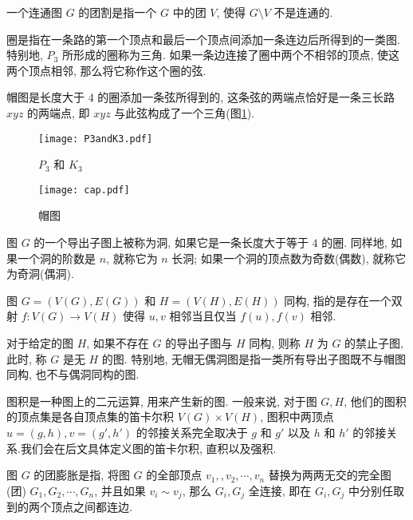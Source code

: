 \documentclass[12pt,a4paper]{article}%
\begin{document}
一个连通图 $G$ 的团割是指一个 $G$ 中的团 $V$, 使得 $G \setminus V$ 不是连通的.

圈是指在一条路的第一个顶点和最后一个顶点间添加一条连边后所得到的一类图. 特别地, $P_3$ 所形成的圈称为三角. 如果一条边连接了圈中两个不相邻的顶点, 使这两个顶点相邻, 那么将它称作这个圈的弦.

帽图是长度大于 $4$ 的圈添加一条弦所得到的, 这条弦的两端点恰好是一条三长路 $xyz$ 的两端点, 即 $xyz$ 与此弦构成了一个三角(图\ref{cap}).

\begin{figure}[t]
    \begin{minipage}[t]{0.35\textwidth}
        \centering
        \texttt{[image: P3andK3.pdf]}
        \caption{$P_3$ 和 $K_3$}
        \label{P3andK3}
    \end{minipage}
    \hfill
    \begin{minipage}[t]{0.3\textwidth} 
        \centering
        \texttt{[image: cap.pdf]}
        \caption{帽图}
        \label{cap}
    \end{minipage}
\end{figure}

图 $G$ 的一个导出子图上被称为洞, 如果它是一条长度大于等于 $4$ 的圈. 同样地, 如果一个洞的阶数是 $n$, 就称它为 $n$ 长洞; 如果一个洞的顶点数为奇数(偶数), 就称它为奇洞(偶洞).

图 $G = (V(G), E(G))$ 和 $H = (V(H), E(H))$ 同构, 指的是存在一个双射 $f: V(G) \rightarrow V(H)$ 使得 $u,v$ 相邻当且仅当 $f(u),f(v)$ 相邻.

对于给定的图 $H$, 如果不存在 $G$ 的导出子图与 $H$ 同构, 则称 $H$ 为 $G$ 的禁止子图, 此时, 称 $G$ 是无 $H$ 的图. 特别地, 无帽无偶洞图是指一类所有导出子图既不与帽图同构, 也不与偶洞同构的图.

图积是一种图上的二元运算, 用来产生新的图. 一般来说, 对于图 $G,H$, 他们的图积的顶点集是各自顶点集的笛卡尔积 $V(G) \times V(H)$, 图积中两顶点 $u = (g,h),v = (g',h')$ 的邻接关系完全取决于 $g$ 和 $g'$ 以及 $h$ 和 $h'$ 的邻接关系.我们会在后文具体定义图的笛卡尔积, 直积以及强积.

图 $G$ 的团膨胀是指, 将图 $G$ 的全部顶点 $v_1, ,v_2, \cdots , v_n$ 替换为两两无交的完全图(团) $G_1, G_2, \cdots , G_n$, 并且如果 $v_i \sim v_j$, 那么 $G_i, G_j$ 全连接, 即在 $G_i, G_j$ 中分别任取到的两个顶点之间都连边.
\end{document}
